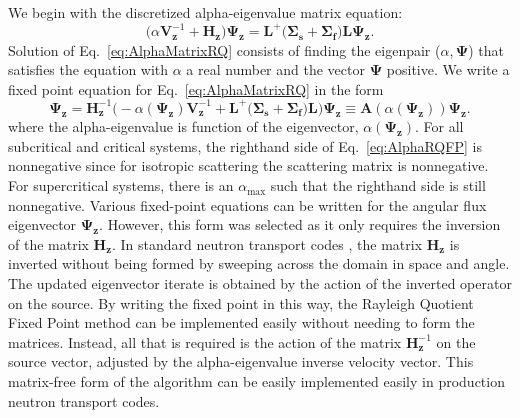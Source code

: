 We begin with the discretized alpha-eigenvalue matrix equation:
\begin{equation}
	\big ( \alpha \mathbf{V}_{\mathbf{z}}^{-1} + \mathbf{H_{z}} \big ) \mathbf{\Psi_{z}} = \mathbf{L}^{+} \big ( \mathbf{\Sigma_{s}} + \mathbf{\Sigma_{f}} \big ) \mathbf{L} \mathbf{\Psi_{z}}.
	\label{eq:AlphaMatrixRQ}
\end{equation}
Solution of Eq.~\ref{eq:AlphaMatrixRQ} consists of finding the eigenpair ($\alpha,\mathbf{\Psi}$) that satisfies the equation with $\alpha$ a real number and the vector $\mathbf{\Psi}$ positive. We write a fixed point equation for Eq.~\ref{eq:AlphaMatrixRQ} in the form
\begin{equation}
	\mathbf{\Psi_{z}} = \mathbf{H}^{-1}_{\mathbf{z}} \big ( -\alpha(\mathbf{\Psi_{z}}) \mathbf{V}_{\mathbf{z}}^{-1} + \mathbf{L}^{+} \big ( \mathbf{\Sigma_{s}} + \mathbf{\Sigma_{f}} \big ) \mathbf{L} \big ) \mathbf{\Psi_{z}} \equiv \mathbf{A}(\alpha(\mathbf{\Psi_{z}})) \mathbf{\Psi_{z}}.
	\label{eq:AlphaRQFP}
\end{equation}
where the alpha-eigenvalue is function of the eigenvector, $\alpha(\mathbf{\Psi_{z}})$. For all subcritical and critical systems, the righthand side of Eq.~\ref{eq:AlphaRQFP} is nonnegative since for isotropic scattering the scattering matrix is nonnegative. For supercritical systems, there is an $\alpha_{\text{max}}$ such that the righthand side is still nonnegative. Various fixed-point equations can be written for the angular flux eigenvector $\mathbf{\Psi_{z}}$. However, this form was selected as it only requires the inversion of the matrix $\mathbf{H_{z}}$. In standard neutron transport codes \cite{hanebutte_ardra_1999} \cite{alcouffe2005partisn}, the matrix $\mathbf{H_{z}}$ is inverted without being formed by sweeping across the domain in space and angle. The updated eigenvector iterate is obtained by the action of the inverted operator on the source. By writing the fixed point in this way, the Rayleigh Quotient Fixed Point method can be implemented easily without needing to form the matrices. Instead, all that is required is the action of the matrix $\mathbf{H}^{-1}_{\mathbf{z}}$ on the source vector, adjusted by the alpha-eigenvalue inverse velocity vector. This matrix-free form of the algorithm can be easily implemented easily in production neutron transport codes.

